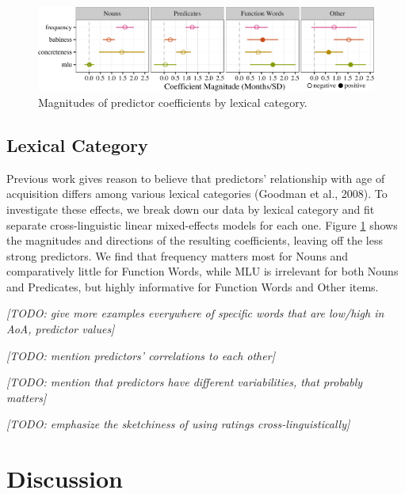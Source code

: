\documentclass[10pt, letterpaper]{article}
\newenvironment{CodeChunk}{}{}
\begin{document}
\begin{CodeChunk}
\begin{figure}[tb]

{\centering \includegraphics{figs/coefs_lexcat-1} 

}

\caption[Magnitudes of predictor coefficients by lexical category]{Magnitudes of predictor coefficients by lexical category.}\label{fig:coefs_lexcat}
\end{figure}
\end{CodeChunk}

\subsection{Lexical Category}\label{lexical-category}

Previous work gives reason to believe that predictors' relationship with
age of acquisition differs among various lexical categories (Goodman et
al., 2008). To investigate these effects, we break down our data by
lexical category and fit separate cross-linguistic linear mixed-effects
models for each one. Figure \ref{fig:coefs_lexcat} shows the magnitudes
and directions of the resulting coefficients, leaving off the less
strong predictors. We find that frequency matters most for Nouns and
comparatively little for Function Words, while MLU is irrelevant for
both Nouns and Predicates, but highly informative for Function Words and
Other items.

\emph{{[}TODO: give more examples everywhere of specific words that are
low/high in AoA, predictor values{]}}

\emph{{[}TODO: mention predictors' correlations to each other{]}}

\emph{{[}TODO: mention that predictors have different variabilities,
that probably matters{]}}

\emph{{[}TODO: emphasize the sketchiness of using ratings
cross-linguistically{]}}

\newpage

\section{Discussion}\label{discussion}
\end{document}
